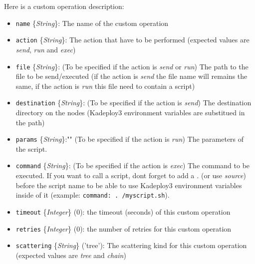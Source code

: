 \documentclass[a4wide,10pt,oneside]{book}
\newcommand{\yfield}[2]{\texttt{#1} {\small\{{\emph{#2}}\}}:}
\newcommand{\yfieldd}[3]{\texttt{#1} {\small\{{\emph{#2}}\}} {\small(}#3{\small)}:}
\begin{document}
Here is a custom operation description:
\begin{itemize}
  \item \yfield{name}{String} The name of the custom operation
  \item \yfield{action}{String} The action that have to be performed (expected values are \emph{send}, \emph{run} and \emph{exec})
  \item \yfield{file}{String} \small{(To be specified if the action is \emph{send} or \emph{run})} The path to the file to be send/executed (if the action is \emph{send} the file name will remains the same, if the action is \emph{run} this file need to contain a script)
  \item \yfield{destination}{String} \small{(To be specified if the action is \emph{send})} The destination directory on the nodes (Kadeploy3 environment variables are substitued in the path)
  \item \yfield{params}{String}{""} \small{(To be specified if the action is \emph{run})} The parameters of the script.
  \item \yfield{command}{String} \small{(To be specified if the action is \emph{exec})} The command to be executed. If you want to call a script, dont forget to add a \emph{.} (or use \emph{source}) before the script name to be able to use Kadeploy3 environment variables inside of it (example: \texttt{command: . /myscript.sh}).
  \item \yfieldd{timeout}{Integer}{0} the timeout (seconds) of this custom operation
  \item \yfieldd{retries}{Integer}{0} the number of retries for this custom operation
  \item \yfieldd{scattering}{String}{'tree'} The scattering kind for this custom operation (expected values are \emph{tree} and \emph{chain})
\end{itemize} 
\end{document}
